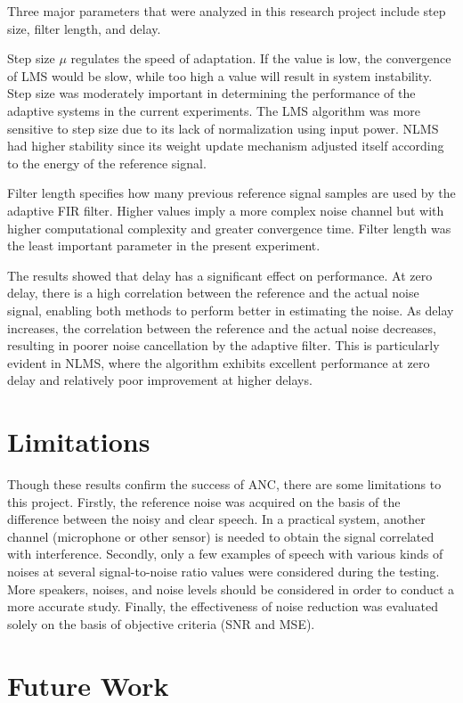 \documentclass[12pt]{article}
\begin{document}
Three major parameters that were analyzed in this research project include step size, filter length, and delay.

Step size $\mu$ regulates the speed of adaptation. If the value is low, the convergence of LMS would be slow, while too high a value will result in system instability. Step size was moderately important in determining the performance of the adaptive systems in the current experiments. The LMS algorithm was more sensitive to step size due to its lack of normalization using input power. NLMS had higher stability since its weight update mechanism adjusted itself according to the energy of the reference signal.

Filter length specifies how many previous reference signal samples are used by the adaptive FIR filter. Higher values imply a more complex noise channel but with higher computational complexity and greater convergence time. Filter length was the least important parameter in the present experiment.

The results showed that delay has a significant effect on performance. At zero delay, there is a high correlation between the reference and the actual noise signal, enabling both methods to perform better in estimating the noise. As delay increases, the correlation between the reference and the actual noise decreases, resulting in poorer noise cancellation by the adaptive filter. This is particularly evident in NLMS, where the algorithm exhibits excellent performance at zero delay and relatively poor improvement at higher delays.

\section{Limitations}


Though these results confirm the success of ANC, there are some limitations to this project. Firstly, the reference noise was acquired on the basis of the difference between the noisy and clear speech. In a practical system, another channel (microphone or other sensor) is needed to obtain the signal correlated with interference. Secondly, only a few examples of speech with various kinds of noises at several signal-to-noise ratio values were considered during the testing. More speakers, noises, and noise levels should be considered in order to conduct a more accurate study. Finally, the effectiveness of noise reduction was evaluated solely on the basis of objective criteria (SNR and MSE).

\section{Future Work}
\end{document}

